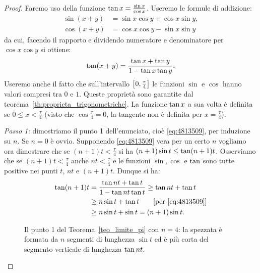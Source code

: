 \begin{proof}
Faremo uso della funzione $\operatorname{tan} x= \frac{\sin x}{\cos x}$.
Useremo le formule di addizione:
\begin{align*}
 \sin(x+y) &= \sin x\cos y + \cos x \sin y,\\
 \cos(x+y) &= \cos x \cos y - \sin x \sin y  
\end{align*}
da cui, facendo il rapporto e dividendo numeratore 
e denominatore per $\cos x \cos y$ si ottiene:
\[
  \operatorname{tan}(x+y) = \frac{\operatorname{tan} x + \operatorname{tan} y}{1-\operatorname{tan} x \operatorname{tan} y}.
\]
Useremo anche il fatto che sull'intervallo 
$\left[0,\frac \tau 4\right]$
le funzioni $\sin$ e $\cos $
hanno valori compresi tra $0$ e $1$.
Queste proprietà sono garantite 
dal teorema~\ref{th:proprieta_trigonometriche}.
La funzione $\operatorname{tan} x$ a sua volta è definita se $0\le x < \frac \tau 4$
(visto che $\cos \frac \tau 4 = 0$, la tangente non è definita per $x=\frac \tau 4$).

\emph{Passo 1:}
dimostriamo il punto 1 dell'enunciato, cioè \eqref{eq:4813509}, 
per induzione su $n$.
Se $n=0$ è ovvio.
Supponendo \eqref{eq:4813509} vera per un certo $n$
vogliamo ora dimostrare che se $(n+1)t < \frac \tau 4$
si ha $(n+1)\sin t \le \operatorname{tan} (n+1)t$.
Osserviamo che se $(n+1)t<\frac \tau 4$ anche $nt < \frac \tau 4$ e 
le funzioni $\sin,\cos$ e $\operatorname{tan}$ sono tutte positive nei punti 
$t$, $nt$ e $(n+1)t$.
Dunque si ha:
\begin{align*}
\operatorname{tan} (n+1) t 
  &= \frac{\operatorname{tan} nt + \operatorname{tan} t}{1-\operatorname{tan} nt \operatorname{tan} t}
  \ge \operatorname{tan} nt + \operatorname{tan} t \\
  &\ge n\sin t + \operatorname{tan} t \qquad\text{[per \eqref{eq:4813509}]}\\
  &\ge n\sin t + \sin t
  =(n+1)\sin t. 
\end{align*}
%
\begin{figure}
  \centering%
  \caption{%
  Il punto 1 del Teorema~\ref{teo_limite_pi}
  con $n=4$: la spezzata è formata da $n$ segmenti
  di lunghezza $\sin t$ ed è più corta del segmento verticale
  di lunghezza $\operatorname{tan} nt$.
  }
  \label{fig:passo1_pi}
\end{figure}


\end{proof}
